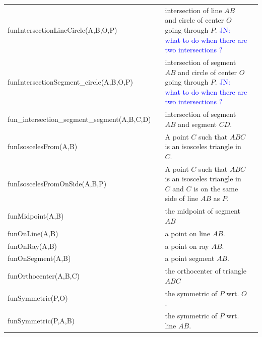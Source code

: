\documentclass[a4wide,9pt,landscape]{article}
\newcommand{\jn}[1]{\textcolor{blue}{JN: #1}}
\begin{document}
\begin{tabularx}{270mm}{>{\ttfamily}llXX}
funIntersectionLineCircle(A,B,O,P) & 
&
intersection of line $AB$ and circle of center $O$ going through $P$. \jn{what to do when there are two intersections ?} \\
funIntersectionSegment\_circle(A,B,O,P) & 
&
intersection of segment $AB$ and circle of center $O$ going through $P$. \jn{what to do when there are two intersections ?} \\
fun\_intersection\_segment\_segment(A,B,C,D) & 
&
intersection of segment $AB$ and segment $CD$. \\
funIsoscelesFrom(A,B) & 
&
A point $C$ such that $ABC$ is an isosceles triangle in $C$. \\
funIsoscelesFromOnSide(A,B,P) & 
&
A point $C$ such that $ABC$ is an isosceles triangle in $C$ and $C$ 
is on the same side of line $AB$ as $P$. \\
funMidpoint(A,B) & 
&
the midpoint of segment $AB$ \\
funOnLine(A,B) & &
a point on line $AB$. \\
funOnRay(A,B) & &
a point on ray $AB$. \\
funOnSegment(A,B) & &
a point segment $AB$. \\
funOrthocenter(A,B,C) & 
&
the orthocenter of triangle $ABC$ \\
funSymmetric(P,O) & 
&
the symmetric of $P$ wrt. $O$. \\
funSymmetric(P,A,B) & 
&
the symmetric of $P$ wrt. line $AB$. \\
\bottomrule
\end{tabularx}

\end{document}
